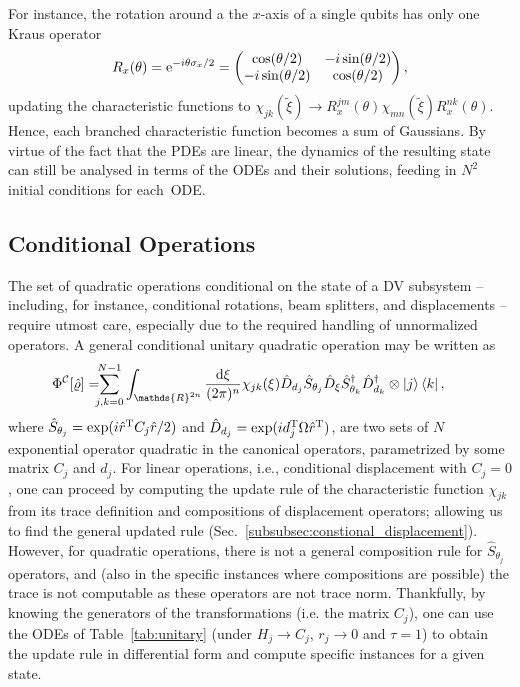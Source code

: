 \documentclass[%
reprint,
superscriptaddress,
nofootinbib,
 amsmath,amssymb,
prx,
floatfix,
]{revtex4-2}
\begin{document}
For instance, the rotation around a the $x$-axis of a single qubits has only one Kraus operator 
\begin{equation}
    R_x(\theta) = {\rm e}^{-i\theta\sigma_x/2} = \begin{pmatrix} \cos(\theta/2) & -i\sin(\theta/2) \\ -i\sin(\theta/2) & \cos(\theta/2) \end{pmatrix} ,
\end{equation}
updating  the characteristic functions to 
   $ \chi_{jk} (\tilde{\xi})\to R^{jm}_x(\theta) \chi_{m n}(\tilde{\xi}) R^{nk}_x(\theta)  $. Hence, each branched characteristic function becomes a sum of Gaussians. By virtue of the fact that the PDEs are linear, the dynamics of the resulting state can still be analysed in terms of the ODEs and their solutions, feeding in $N^2$ initial conditions for each~ODE.

\subsection{Conditional Operations}

The set of quadratic operations conditional on the state of a DV subsystem -- including, for instance, conditional rotations, beam splitters, and displacements -- require utmost care, especially due to the required handling of unnormalized operators. A general conditional unitary quadratic operation may be written as
\begin{align}
    \hspace{-0.2cm}\Phi^{\mathcal{C}}[\hat{\varrho}] &= \hspace*{-0.2cm} \sum_{j, k  = 0}^{N-1} \int_{\mathds{R}^{2n}} \frac{\text{d} \xi}{(2 \pi)^n} \chi_{jk} (\xi) \hat{D}_{d_j} \hat{S}_{\theta_j} \hat{D}_{\xi} \hat{S}_{\theta_k}^\dag \hat{D}_{d_k}^\dag  \otimes \ket{j} \bra{k} , \nonumber
\end{align}
where $\hat{S}_{\theta_j} = \exp(i  \hat{r}^{\rm T} C_j  \hat{r}/2)$ and $\hat{D}_{d_j} = \exp(i  d_j^{\rm T} \Omega \hat{r}^{\rm T} )$, are two sets of $N$ exponential operator quadratic in the canonical operators, parametrized by some matrix $C_j$ and $d_j$. For linear operations, i.e., conditional displacement with $C_j = 0$, one can proceed by computing the update rule of the characteristic function $\chi_{jk}$ from its trace definition and compositions of displacement operators; allowing us to find the general updated rule (Sec.~\ref{subsubsec:constional_displacement}). However, for quadratic operations, there is not a general composition rule for $\hat{S}_{\theta_j}$ operators, and (also in the specific instances where compositions are possible) the trace is not computable as these operators are not trace norm. Thankfully, by knowing the generators of the transformations (i.e. the matrix $C_j$), one can use the ODEs of Table~\ref{tab:unitary}  (under $H_j \to C_j$, $r_j \to 0$ and $\tau = 1$) to obtain the update rule in differential form and compute specific instances for a given state.  
\end{document}
